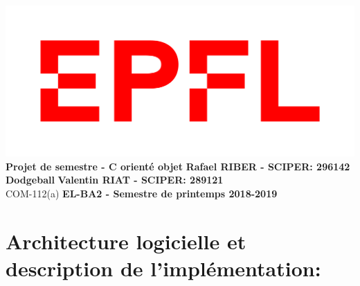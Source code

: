 \documentclass[a4paper, 11pt]{article}
\begin{document}
\noindent \includegraphics[scale=0.2]{figures/logo.png}\\
\large\textbf{Projet de semestre - C\raisebox{.5\height}{\scalebox{.5}{++}} orienté objet} \hfill \textbf{Rafael RIBER  - SCIPER: 296142} \\
\large\textbf{Dodgeball} \hfill \hfill \textbf{Valentin RIAT - SCIPER: 289121}\\
\normalsize COM-112(a) \hfill \textbf{EL-BA2 - Semestre de printemps 2018-2019}\\

\section*{Architecture logicielle et description de l’implémentation:}
\end{document}
